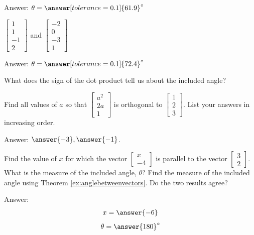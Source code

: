 \documentclass{ximera}
\begin{document}
\begin{problem}
\begin{problem}
   Answer: $\theta=\answer[tolerance=0.1]{61.9}^\circ$
  \end{problem}

\begin{problem}\label{prob:anglebetweenvectors4}
  $\begin{bmatrix}1\\1\\-1\\2\end{bmatrix}$ and $\begin{bmatrix}-2\\0\\-3\\1\end{bmatrix}$
  
   Answer: $\theta=\answer[tolerance=0.1]{72.4}^\circ$
  \end{problem}
  
  \end{problem}

\begin{problem}\label{prob:dotproductsign}
What does the sign of the dot product tell us about the included angle?
\end{problem}

\begin{problem}\label{prob:orthvectorsdot}
Find all values of $a$ so that $\begin{bmatrix}a^2\\2a\\1\end{bmatrix}$ is orthogonal to $\begin{bmatrix}1\\2\\3\end{bmatrix}$.  List your answers in increasing order.

Answer: $\answer{-3}, \answer{-1}$.
\end{problem}

\begin{problem}\label{prob:parallelvectdot}
Find the value of $x$ for which the vector $\begin{bmatrix}x\\-4\end{bmatrix}$ is parallel to the vector $\begin{bmatrix}3\\2\end{bmatrix}$. What is the measure of the included angle, $\theta$? Find the measure of the included angle using Theorem \ref{ex:anglebetweenvectors}.  Do the two results agree?

Answer: 
$$x=\answer{-6}$$
$$\theta=\answer{180}^\circ$$
\end{problem}
\end{document}
